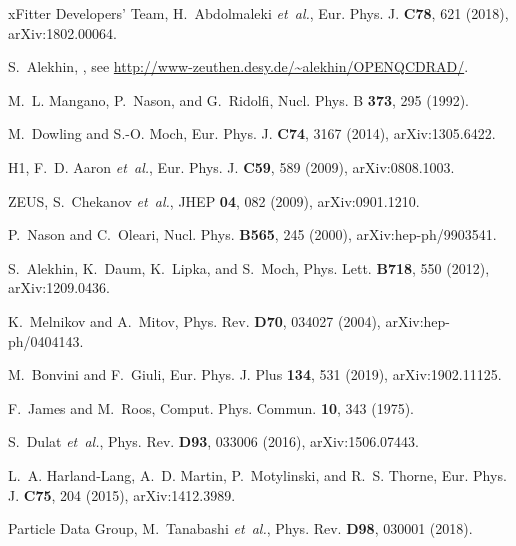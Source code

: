 \documentclass[a4paper,11pt]{article}
\begin{document}
\begin{thebibliography}{99}
xFitter Developers' Team, H.~Abdolmaleki {\em et~al.},
\newblock Eur. Phys. J. {\bf C78}, 621 (2018), arXiv:1802.00064.

S.~Alekhin,
,
\newblock see \url{http://www-zeuthen.desy.de/~alekhin/OPENQCDRAD/}.

M.~L. Mangano, P.~Nason, and G.~Ridolfi,
\newblock Nucl. Phys. B {\bf 373}, 295 (1992).

M.~Dowling and S.-O. Moch,
\newblock Eur. Phys. J. {\bf C74}, 3167 (2014), arXiv:1305.6422.

H1, F.~D. Aaron {\em et~al.},
\newblock Eur. Phys. J. {\bf C59}, 589 (2009), arXiv:0808.1003.

ZEUS, S.~Chekanov {\em et~al.},
\newblock JHEP {\bf 04}, 082 (2009), arXiv:0901.1210.

P.~Nason and C.~Oleari,
\newblock Nucl. Phys. {\bf B565}, 245 (2000), arXiv:hep-ph/9903541.

S.~Alekhin, K.~Daum, K.~Lipka, and S.~Moch,
\newblock Phys. Lett. {\bf B718}, 550 (2012), arXiv:1209.0436.

K.~Melnikov and A.~Mitov,
\newblock Phys. Rev. {\bf D70}, 034027 (2004), arXiv:hep-ph/0404143.

M.~Bonvini and F.~Giuli,
\newblock Eur. Phys. J. Plus {\bf 134}, 531 (2019), arXiv:1902.11125.

F.~James and M.~Roos,
\newblock Comput. Phys. Commun. {\bf 10}, 343 (1975).

S.~Dulat {\em et~al.},
\newblock Phys. Rev. {\bf D93}, 033006 (2016), arXiv:1506.07443.

L.~A. Harland-Lang, A.~D. Martin, P.~Motylinski, and R.~S. Thorne,
\newblock Eur. Phys. J. {\bf C75}, 204 (2015), arXiv:1412.3989.

Particle Data Group, M.~Tanabashi {\em et~al.},
\newblock Phys. Rev. {\bf D98}, 030001 (2018).


\end{thebibliography}
\end{document}
